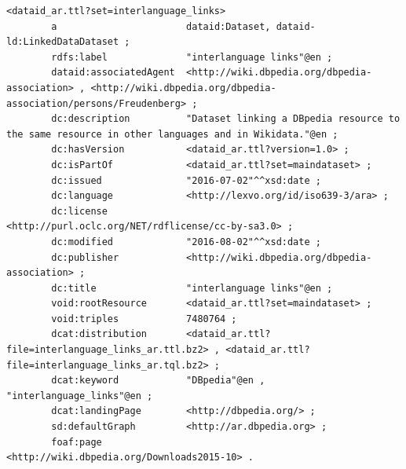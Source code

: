 \documentclass[a4paper,english,twoside,BCOR1.5cm,headsepline,DIV12,appendixprefix,final,12pt]{scrbook}
\begin{document}
\begin{lstlisting}[language=ttl, captionpos=b, label=lst:dcex,linewidth=\columnwidth,breaklines=true,basicstyle=\ttfamily\scriptsize]
<dataid_ar.ttl?set=interlanguage_links>
        a                       dataid:Dataset, dataid-ld:LinkedDataDataset ;
        rdfs:label              "interlanguage links"@en ;
        dataid:associatedAgent  <http://wiki.dbpedia.org/dbpedia-association> , <http://wiki.dbpedia.org/dbpedia-association/persons/Freudenberg> ;
        dc:description          "Dataset linking a DBpedia resource to the same resource in other languages and in Wikidata."@en ;
        dc:hasVersion           <dataid_ar.ttl?version=1.0> ;
        dc:isPartOf             <dataid_ar.ttl?set=maindataset> ;
        dc:issued               "2016-07-02"^^xsd:date ;
        dc:language             <http://lexvo.org/id/iso639-3/ara> ;
        dc:license              <http://purl.oclc.org/NET/rdflicense/cc-by-sa3.0> ;
        dc:modified             "2016-08-02"^^xsd:date ;
        dc:publisher            <http://wiki.dbpedia.org/dbpedia-association> ;
        dc:title                "interlanguage links"@en ;
        void:rootResource       <dataid_ar.ttl?set=maindataset> ;
        void:triples            7480764 ;
        dcat:distribution       <dataid_ar.ttl?file=interlanguage_links_ar.ttl.bz2> , <dataid_ar.ttl?file=interlanguage_links_ar.tql.bz2> ;
        dcat:keyword            "DBpedia"@en , "interlanguage_links"@en ;
        dcat:landingPage        <http://dbpedia.org/> ;
        sd:defaultGraph         <http://ar.dbpedia.org> ;
        foaf:page               <http://wiki.dbpedia.org/Downloads2015-10> .
        

\end{lstlisting}
\end{document}
